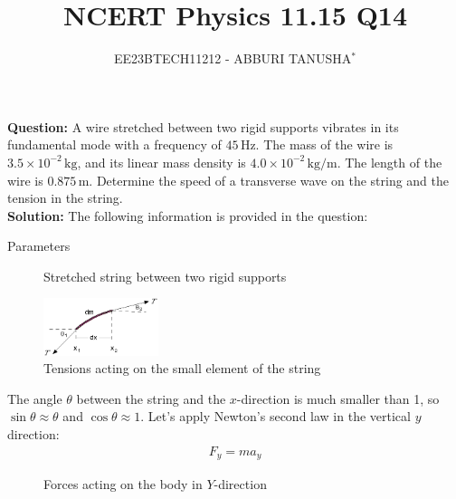 \documentclass[journal,12pt,twocolumn]{IEEEtran}
\title{
	
\title{NCERT Physics 11.15 Q14}
\author{EE23BTECH11212 - ABBURI TANUSHA$^{*}$%
}


}
\theoremstyle{remark}
\begin{document}
\maketitle

\textbf{Question:} 
A wire stretched between two rigid supports vibrates in its fundamental mode with a frequency of $45 \, \text{Hz}$. The mass of the wire is $3.5 \times 10^{-2} \, \text{kg}$, and its linear mass density is $4.0 \times 10^{-2} \, \text{kg/m}$. The length of the wire is $0.875 \, \text{m}$. Determine the speed of a transverse wave on the string and the tension in the string.
\\

     
\textbf{Solution: }
The following information is provided in the question:

 \begin{table}[h]
 	\centering
 	\resizebox{6 cm}{!}{
 		
 	}
 	\vspace{6 pt}
 	\caption{Parameters}
 	\label{tab:my_label} 
 \end{table}
 
\begin{figure}[htb]
	\centering
	
	\caption{Stretched string between two rigid supports}
	\label{fig:1}
\end{figure}

\begin{figure}[htb]
  \centering
  \includegraphics[width=0.3\textwidth]{figs/fig2.png} 
  \caption{Tensions acting on the small element of the string}
  \label{fig:2}
\end{figure}




 
The angle $\theta$ between the string and the $x$-direction is much smaller than 1, so $\sin \theta \approx \theta$ and $\cos \theta \approx 1$.
Let's apply Newton's second law in the vertical $y$ direction:
\begin{align}
F_y = ma_y
\end{align}

\begin{figure}[htb]
	\centering
	
	\caption{Forces acting on the body in $Y$-direction}
	\label{fig:3}
\end{figure}
\end{document}
